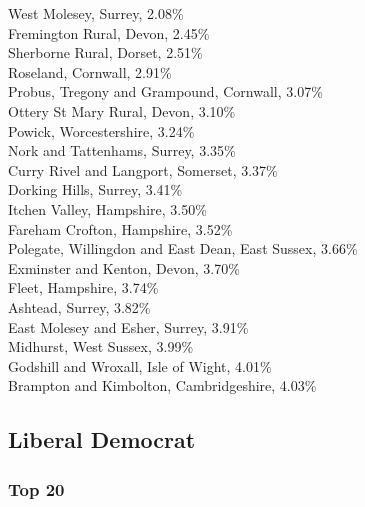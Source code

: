 \documentclass[a4paper,openany,10pt]{book}
\begin{document}
West Molesey, Surrey, 2.08\%\\
Fremington Rural, Devon, 2.45\%\\
Sherborne Rural, Dorset, 2.51\%\\
Roseland, Cornwall, 2.91\%\\
Probus, Tregony and Grampound, Cornwall, 3.07\%\\
Ottery St Mary Rural, Devon, 3.10\%\\
Powick, Worcestershire, 3.24\%\\
Nork and Tattenhams, Surrey, 3.35\%\\
Curry Rivel and Langport, Somerset, 3.37\%\\
Dorking Hills, Surrey, 3.41\%\\
Itchen Valley, Hampshire, 3.50\%\\
Fareham Crofton, Hampshire, 3.52\%\\
Polegate, Willingdon and East Dean, East Sussex, 3.66\%\\
Exminster and Kenton, Devon, 3.70\%\\
Fleet, Hampshire, 3.74\%\\
Ashtead, Surrey, 3.82\%\\
East Molesey and Esher, Surrey, 3.91\%\\
Midhurst, West Sussex, 3.99\%\\
Godshill and Wroxall, Isle of Wight, 4.01\%\\
Brampton and Kimbolton, Cambridgeshire, 4.03\%\\

\subsection*{Liberal Democrat}

\subsubsection*{Top 20}
\end{document}
